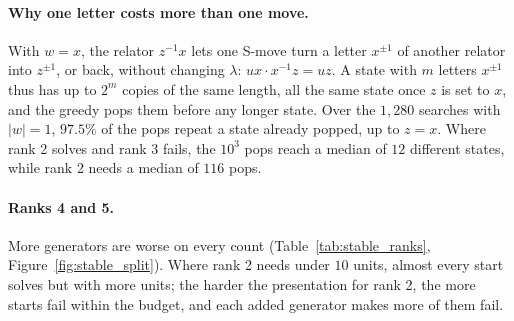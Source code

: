 \paragraph{Why one letter costs more than one move.} With $w=x$, the relator $z^{-1}x$ lets one S-move turn a letter
$x^{\pm1}$ of another relator into $z^{\pm1}$, or back, without changing $\lambda$: $ux\cdot x^{-1}z=uz$. A state with
$m$ letters $x^{\pm1}$ thus has up to $2^m$ copies of the same length, all the same state once $z$ is set to $x$, and
the greedy pops them before any longer state. Over the $1{,}280$ searches with $|w|=1$, $97.5\%$ of the pops repeat a
state already popped, up to $z=x$. Where rank 2 solves and rank 3 fails, the $10^3$ pops reach a median of $12$
different states, while rank 2 needs a median of $116$ pops.


\paragraph{Ranks 4 and 5.} More generators are worse on every count (Table~\ref{tab:stable_ranks},
Figure~\ref{fig:stable_split}). Where rank 2 needs under $10$ units, almost every start solves but with more units;
the harder the presentation for rank 2, the more starts fail within the budget, and each added generator makes more
of them fail.
